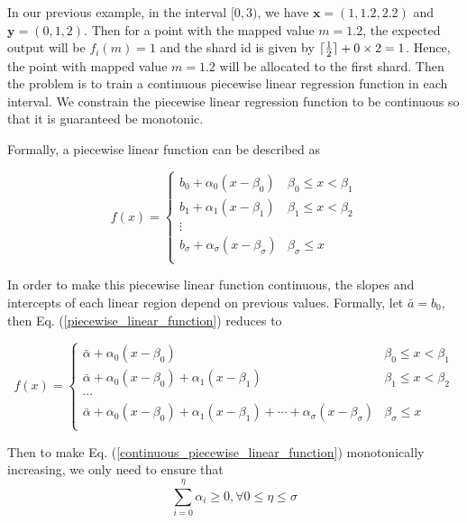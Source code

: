 \begin{mscexample}
	In our previous example, in the interval $[0,3)$, we have $\boldsymbol{x}=(1,1.2,2.2)$ and $\boldsymbol{y}=(0,1,2)$. Then for a point with the mapped value $m=1.2$, the expected output will be $f_i(m)=1$ and the shard id is given by $\lceil\frac{1}{2}\rceil+0\times 2=1$. Hence, the point with mapped value $m=1.2$ will be allocated to the first shard. Then the problem is to train a continuous piecewise linear regression function in each interval. We constrain the piecewise linear regression function to be continuous so that it is guaranteed be monotonic.
\end{mscexample}

Formally, a piecewise linear function can be described as 

\begin{equation}
\label{piecewise_linear_function}
	f(x)= \begin{cases} 
      b_0+\alpha_0(x-\beta_0) & \beta_0\leq x < \beta_1 \\
      b_1+\alpha_1(x-\beta_1) &  \beta_1\leq x < \beta_2 \\
      \vdots \\
      b_\sigma+\alpha_\sigma(x-\beta_\sigma) &  \beta_\sigma\leq x \\
   \end{cases}
\end{equation}

In order to make this piecewise linear function continuous, the slopes and intercepts of each linear region depend on previous values. Formally, let $\bar{a}=b_0$, then Eq. (\ref{piecewise_linear_function}) reduces to

\begin{equation}
	\label{continuous_piecewise_linear_function}
	f(x)= \begin{cases} 
      \bar{\alpha}+\alpha_0(x-\beta_0) & \beta_0\leq x < \beta_1 \\
      \bar{\alpha}+\alpha_0(x-\beta_0) + \alpha_1(x-\beta_1) &  \beta_1\leq x < \beta_2 \\
      \cdots \\
      \bar{\alpha}+\alpha_0(x-\beta_0) + \alpha_1(x-\beta_1)+\cdots+\alpha_\sigma(x-\beta_\sigma) &  \beta_\sigma\leq x \\
   \end{cases}
\end{equation}


Then to make Eq. (\ref{continuous_piecewise_linear_function}) monotonically increasing, we only need to ensure that $$\sum_{i=0}^\eta \alpha_i\geq 0, \forall 0\leq \eta\leq \sigma$$

